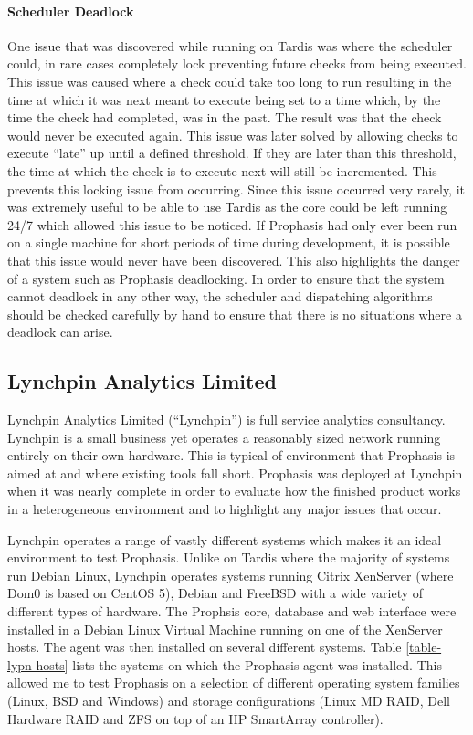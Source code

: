 \documentclass[bsc,deptreport,twoside,parskip,singlespacing,notimes]{infthesis}
\begin{document}
\paragraph*{Scheduler Deadlock}
	One issue that was discovered while running on Tardis was where the scheduler
	could, in rare cases completely lock preventing future checks from being
	executed.  This issue was caused where a check could take too long to run
	resulting in the time at which it was next meant to execute being set to a
	time which, by the time the check had completed, was in the past.  The result
	was that the check would never be executed again.  This issue was later solved by
	allowing checks to execute ``late'' up until a defined threshold. If they are
	later than this threshold, the time at which the check is to execute next will
	still be incremented.  This prevents this locking issue from occurring. Since
	this issue occurred very rarely, it was extremely useful to be able to use
	Tardis as the core could be left running 24/7 which allowed this issue to be
	noticed. If Prophasis had only ever been run on a single machine for short
	periods of time during development, it is possible that this issue would never
	have been discovered.  This also highlights the danger of a system such as
	Prophasis deadlocking. In order to ensure that the system cannot deadlock in
	any other way, the scheduler and dispatching algorithms should be checked
	carefully by hand to ensure that there is no situations where a deadlock can
	arise.

\pagebreak
\subsection{Lynchpin Analytics Limited}

	Lynchpin Analytics Limited (``Lynchpin'') is full service analytics consultancy.
	Lynchpin is a small business yet
	operates a reasonably sized network running entirely on their own hardware.
	This is typical of environment that Prophasis is aimed at and where existing
	tools fall short.  Prophasis was deployed at Lynchpin when it was nearly
	complete in order to evaluate how the finished product works in a heterogeneous
	environment and to highlight any major issues that occur.


	Lynchpin operates a range of vastly different systems which makes it an
	ideal environment to test Prophasis.  Unlike on Tardis where the majority of
	systems run Debian Linux, Lynchpin operates systems running Citrix XenServer (where
	Dom0 is based on CentOS 5), Debian and FreeBSD with a wide variety of different
	types of hardware.  The Prophsis core, database and web interface were
	installed in a Debian Linux Virtual Machine running on one of the XenServer
	hosts.  The agent was then installed on several different systems.  Table
	\ref{table-lypn-hosts} lists the systems on which the Prophasis agent was
	installed.  This allowed me to test Prophasis on a selection of different
	operating system families (Linux, BSD and Windows) and storage configurations
	(Linux MD RAID, Dell Hardware RAID and ZFS on top of an HP SmartArray
	controller).
\end{document}
